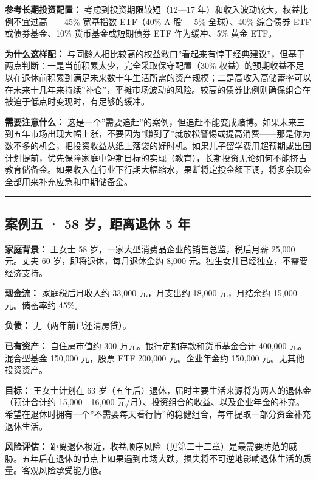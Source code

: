\documentclass[a4paper,11pt,oneside,fontset=none,UTF8,zihao=-4]{ctexbook}
\begin{document}
\textbf{参考长期投资配置：} 考虑到投资期限较短（12---17
年）和收入波动较大，权益比例不宜过高------45\% 宽基指数 ETF（40\% A 股 +
5\% 全球）、40\% 综合债券 ETF 或债券基金、10\% 货币基金或短期债券 ETF
作为缓冲、5\% 黄金 ETF。

\textbf{为什么这样配：}
与同龄人相比较高的权益敞口''看起来有悖于经典建议''，但基于两点判断：一是当前积累太少，完全采取保守配置（30\%
权益）的预期收益不足以在退休前积累到满足未来数十年生活所需的资产规模；二是高收入高储蓄率可以在未来十几年来持续''补仓''，平摊市场波动的风险。较高的债券比例则确保组合在被迫于低点时变现时，有足够的缓冲。

\textbf{需要注意什么：}
这是一个''需要追赶''的案例，但追赶不能变成赌博。如果未来三到五年市场出现大幅上涨，不要因为''赚到了''就放松警惕或提高消费------那是你为数不多的机会，把投资收益从纸上落袋的好时机。如果儿子留学费用超预期或出国计划提前，优先保障家庭中短期目标的实现（教育），长期投资无论如何不能挤占教育储备金。如果收入在行业下行期大幅缩水，果断将定投金额下调，将多余现金全部用来补充应急和中期储备金。

\begin{center}{\color{dh-bronze}\rule{0.2\textwidth}{0.5pt}}\end{center}

\subsection{案例五 · 58 岁，距离退休 5
年}\label{ux6848ux4f8bux4e94-58-ux5c81ux8dddux79bbux9000ux4f11-5-ux5e74}

\textbf{家庭背景：} 王女士 58 岁，一家大型消费品企业的销售总监，税后月薪
25,000 元。丈夫 60 岁，即将退休，每月退休金约 8,000
元。独生女儿已经独立，不需要经济支持。

\textbf{现金流：} 家庭税后月收入约 33,000 元，月支出约 18,000
元，月结余约 15,000 元。储蓄率约 45\%。

\textbf{负债：} 无（两年前已还清房贷）。

\textbf{已有资产：} 自住房市值约 300 万元。银行定期存款和货币基金合计
400,000 元。混合型基金 150,000 元，股票 ETF 200,000 元。企业年金约
150,000 元。无其他投资资产。

\textbf{目标：} 王女士计划在 63
岁（五年后）退休，届时主要生活来源将为两人的退休金（预计合计约
15,000---16,000
元/月）、投资组合的收益、以及企业年金的补充。希望在退休时拥有一个''不需要每天看行情''的稳健组合，每年提取一部分资金补充退休生活。

\textbf{风险评估：}
距离退休极近，收益顺序风险（见第二十二章）是最需要防范的威胁。五年后在退休的节点上如果遇到市场大跌，损失将不可逆地影响退休生活的质量。客观风险承受能力低。
\end{document}
